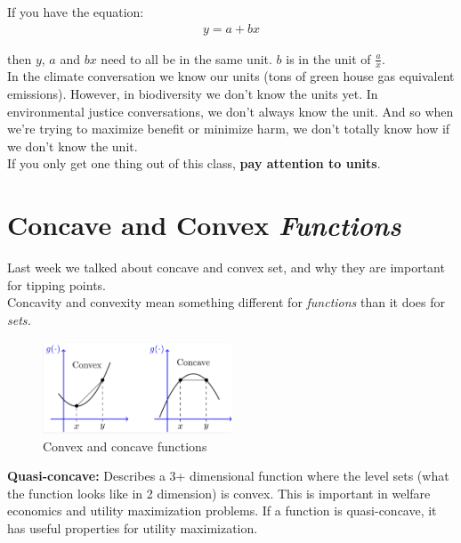 \documentclass{article}
\begin{document}
If you have the equation: 
\begin{align}
    y = a + bx
\end{align}

then $y$, $a$ and $bx$ need to all be in the same unit. $b$ is in the unit of $\frac{a}{x}$.\\

In the climate conversation we know our units (tons of green house gas equivalent emissions). However, in biodiversity we don't know the units yet. In environmental justice conversations, we don't always know the unit. And so when we're trying to maximize benefit or minimize harm, we don't totally know how if we don't know the unit. \\

If you only get one thing out of this class, \textbf{pay attention to units}. 

\section{Concave and Convex \textit{Functions}}
Last week we talked about concave and convex set, and why they are important for tipping points.\\

Concavity and convexity mean something different for \textit{functions} than it does for \textit{sets.}

\begin{figure}[htp]
    \centering
        \includegraphics[width=0.5\textwidth]{Screen Shot 2024-09-09 at 10.45.31 AM.png}
    \caption{Convex and concave functions}
    \label{fig:sample}
\end{figure}

\textbf{Quasi-concave:} Describes a 3+ dimensional function where the level sets (what the function looks like in 2 dimension) is convex. This is important in welfare economics and utility maximization problems. If a function is quasi-concave, it has useful properties for utility maximization. 
\end{document}

